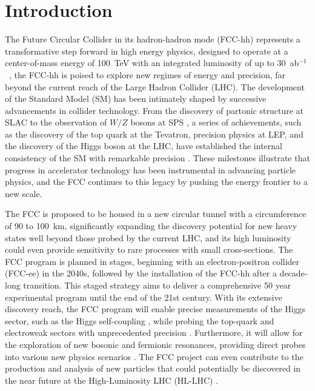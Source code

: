 \documentclass[aps,prev,twocolumn,preprintnumbers,floatfix,nofootinbib]{revtex4-1}
\begin{document}
\maketitle

\section{Introduction}
\label{introduction}

The Future Circular Collider in its hadron-hadron mode (FCC-hh) represents a transformative step forward in high energy physics, designed to operate at a center-of-mass energy of 100~TeV with an integrated luminosity of up to 30~ab$^{-1}$~\cite{FCC:2018vvp,ParticleDataGroup:2024cfk}, the FCC-hh is poised to explore new regimes of energy and precision, far beyond the current reach of the Large Hadron Collider (LHC). The development of the Standard Model (SM) has been intimately shaped by successive advancements in collider technology. From the discovery of partonic structure at SLAC to the observation of $W/Z$ bosons at SPS \cite{Shiltsev_2012, Bloom:1969kc, UA1:1983crd, UA1:1983mne}, a series of achievements, such as the discovery of the top quark at the Tevatron, precision physics at LEP, and the discovery of the Higgs boson at the LHC, have established the internal consistency of the SM with remarkable precision \cite{PhysRevLett.74.2626, ALEPH:2006bhb, ATLAS:2012yve}. These milestones illustrate that progress in accelerator technology has been instrumental in advancing particle physics, and the FCC continues to this legacy by pushing the energy frontier to a new scale. 

The FCC is proposed to be housed in a new circular tunnel with a circumference of 90 to 100~km, significantly expanding the discovery potential for new heavy states well beyond those probed by the current LHC, and its high luminosity could even provide sensitivity to rare processes with small cross-sections. The FCC program is planned in stages, beginning with an electron-positron collider (FCC-ee) in the 2040s, followed by the installation of the FCC-hh after a decade-long transition. This staged strategy aims to deliver a comprehensive 50 year experimental program until the end of the 21st century. With its extensive discovery reach, the FCC program will enable precise measurements of the Higgs sector, such as the Higgs self-coupling \cite{stapf_2025_c94hf-bqc82,lipeles_2025_98taa-y9506}, while probing the top-quark and electroweak sectors with unprecedented precision \cite{Mangano:2016jyj}. Furthermore, it will allow for the exploration of new bosonic and fermionic resonances, providing direct probes into various new physics scenarios \cite{Golling:2016gvc, Blondel:2025kbl}. The FCC project can even contribute to the production and analysis of new particles that could potentially be discovered in the near future at the High-Luminosity LHC (HL-LHC) \cite{CidVidal:2018eel}. \newline
\end{document}
